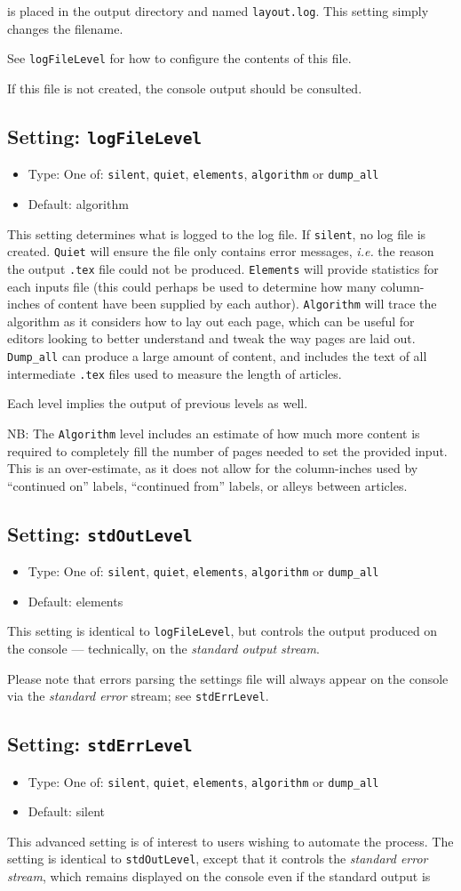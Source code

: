 \documentclass[a4paper,DIV=11]{scrartcl}
\newcommand{\property}[5]{
  \subsection{#1: \texttt{#2}}
  \begin{itemize}
  \item Type: #3
  \item Default: #4
  \end{itemize}
  #5
}
\newcommand{\setting}{\property{Setting}}
\begin{document}
\begin{multicols}{2}
{  is placed in the output directory and named
  \texttt{layout.log}. This setting simply changes the filename.\par
  See \texttt{logFileLevel} for how to configure the contents of this
  file.\par If this file is not created, the console output should be consulted.
}
\setting{logFileLevel}{One of: \texttt{silent}, \texttt{quiet}, \texttt{elements},
  \texttt{algorithm} or \texttt{dump\_all}}{algorithm}{
  This setting determines what is logged to the log file. If
  \texttt{silent}, no log file is created. \texttt{Quiet} will ensure
  the file only contains error messages, \textit{i.e.} the reason the
  output \texttt{.tex} file could not be produced. \texttt{Elements}
  will provide statistics for each inputs file (this could perhaps be used to
  determine how many column-inches of content have been supplied by
  each author). \texttt{Algorithm} will trace the algorithm as it
  considers how to lay out each page, which can be useful for editors
  looking to better understand and tweak the
  way pages are laid out. \texttt{Dump\_all} can produce a large amount of content,
  and includes the text of all intermediate \texttt{.tex} files used
  to measure the length of articles.
  \par
  Each level implies the output of previous levels as well.
  \par
  NB: The \texttt{Algorithm} level includes an estimate of how much
  more content is required to completely fill the number of pages
  needed to set the provided input. This is an over-estimate, as
  it does not allow for the column-inches used by ``continued on'' labels,
  ``continued from'' labels, or alleys between articles.
}
\setting{stdOutLevel}{One of: \texttt{silent}, \texttt{quiet}, \texttt{elements},
  \texttt{algorithm} or \texttt{dump\_all}}{elements}{
  This setting is identical to \texttt{logFileLevel}, but controls the
  output produced on the console --- technically, on the
  \textit{standard output stream}.\par Please note that errors parsing
  the settings file will always appear on the console via the
  \textit{standard error} stream; see \texttt{stdErrLevel}.
}
\setting{stdErrLevel}{One of: \texttt{silent}, \texttt{quiet}, \texttt{elements},
  \texttt{algorithm} or \texttt{dump\_all}}{silent}{
  This advanced setting is of interest to users wishing to automate
  the process. The setting is identical to \texttt{stdOutLevel},
  except that it controls the \textit{standard error stream}, which
  remains displayed on the console even if the standard output is
}
\end{multicols}
\end{document}
